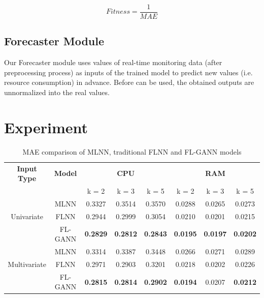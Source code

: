 \documentclass[conference]{IEEEtran}
\begin{document}
\begin{equation} 
Fitness = \frac{1}{MAE}	\label{eq_fitness}
\end{equation}

\subsection{Forecaster Module}
\label{forecater}
Our Forecaster module uses values of real-time monitoring data (after preprocessing process) as inputs of the trained model to predict new values (i.e. resource consumption) in advance. Before can be used, the obtained outputs are unnormalized into the real values.

\section{Experiment}
\label{experiments}

\begin{table}[h]
	\caption{MAE comparison of MLNN, traditional FLNN and FL-GANN models}
	\begin{center}
		\begin{tabular}{| c | c| c | c | c | c | c | c |}
			\hline
			\textbf{Input Type} & \textbf{Model} & \multicolumn{3}{c}{\textbf{CPU}}  & \multicolumn{3}{|c|}{\textbf{RAM}}  \\ \cline{3-8} 
			& & k = 2 & k = 3 & k = 5 & k = 2 & k = 3 & k = 5  \\ [0.5ex] \hline
			& MLNN & 0.3327	& 0.3514 & 0.3570	& 0.0288	& 0.0265 	& 0.0273  \\ 
			Univariate & FLNN	& 0.2944 	& 0.2999  & 0.3054	& 0.0210 	& 0.0201 	& 0.0215  \\
			& FL-GANN	& \textbf{0.2829}	& \textbf{0.2812} & \textbf{0.2843}	& \textbf{0.0195} 	& \textbf{0.0197}	& \textbf{0.0202}  \\ \hline
			
			& MLNN	& 0.3314	& 0.3387 	& 0.3448	& 0.0266 & 0.0271	& 0.0289 \\ 
			Multivariate & FLNN	& 0.2971 	& 0.2903 	& 0.3201	 & 0.0218  & 0.0202	& 0.0226   \\ 
			& FL-GANN	& \textbf{0.2815}	& \textbf{0.2814} 	& \textbf{0.2902}	& \textbf{0.0194} & 0.0207	& \textbf{0.0212}   \\ \hline 
		\end{tabular}
		\label{table:forecasting_results_MLNN_FLNN_FLGANN}
	\end{center}
\end{table}
\end{document}
